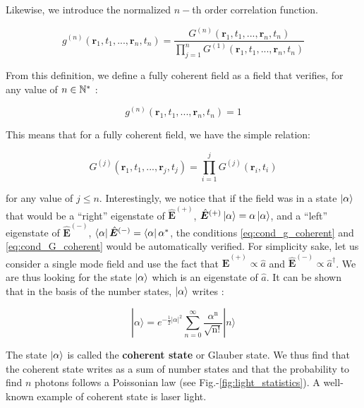 Likewise, we introduce the normalized $n-$th order correlation function.

\begin{equation}
    g^{(n)}\left(\bm{r}_{1}, t_{1}, ...,  \bm{r}_{n}, t_{n}\right)=\frac{G^{(n)}\left(\bm{r}_{1}, t_{1}, ...,  \bm{r}_{n}, t_{n}\right)}{\displaystyle \prod_{j=1}^{n} G^{(1)}\left(\bm{r}_{1}, t_{1}, ..., \bm{r}_{n}, t_{n}\right)}
\end{equation}

\noindent From this definition, we define a fully coherent field as a field that verifies, for any value of $n \in \mathbb{N}^*$ \cite{glauber1963quantum}:

\begin{equation}
    g^{(n)}\left(\bm{r}_{1}, t_{1}, ...,  \bm{r}_{n}, t_{n}\right)  = 1
    \label{eq:cond_g_coherent}
\end{equation}

\noindent This means that for a fully coherent field, we have the simple relation:

\begin{equation}
    G^{(j)}\left(\bm{r}_{1}, t_{1}, ... , \bm{r}_{j}, t_{j}\right) = \prod_{i=1}^{j} G^{(j)}(\bm{r}_{i}, t_{i})
    \label{eq:cond_G_coherent}
\end{equation}

\noindent for any value of $j \leq n$. Interestingly, we notice that if the field was in a state $\ket{\alpha}$ that would be a ``right'' eigenstate of $\hat{\bm{E}}^{(+)}$, $\hat{\bm{E}}^{(+)} \ket{\alpha} = \alpha \ket{\alpha}$, and a ``left'' eigenstate of $\hat{\bm{E}}^{(-)}$, $\bra{\alpha} \hat{\bm{E}}^{(-)} = \bra{\alpha} \alpha^*$, the conditions \ref{eq:cond_g_coherent} and \ref{eq:cond_G_coherent} would be automatically verified. For simplicity sake, let us consider a single mode field and use the fact that $\hat{\bm{E}}^{(+)} \propto \hat{a}$ and $\hat{\bm{E}}^{(-)} \propto \hat{a}^{\dagger}$. We are thus looking for the state $\ket{\alpha}$ which is an eigenstate of $\hat{a}$. It can be shown that in the basis of the number states, $\ket{\alpha}$ writes \cite{glauber1963coherent}:

\begin{equation}
    |\alpha\rangle=e^{-\frac{1}{2}|\alpha|^{2}} \sum_{n=0}^{\infty} \frac{\alpha^{\mathrm{n}}}{\sqrt{\mathrm{n} !}}|n\rangle
    \label{eq:coherent_state}
\end{equation}

\noindent The state $\ket{\alpha}$ is called the \textbf{coherent state} or Glauber state. We thus find that the coherent state writes as a sum of number states and that the probability to find $n$ photons follows a Poissonian law (see Fig.-\ref{fig:light_statistics}). A well-known example of coherent state is laser light.

